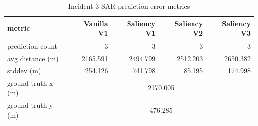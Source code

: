\begin{table}[ht]
\centering
\caption{Incident 3 SAR prediction error metrics}
\label{tab:sar-incident-3}
\begin{tabular}{lrrrr}
\hline
metric & Vanilla V1 & Saliency V1 & Saliency V2 & Saliency V3 \\
\hline
prediction count & 3 & 3 & 3 & 3 \\
avg distance (m) & 2165.591 & 2494.799 & 2512.203 & 2650.382 \\
stddev (m) & 254.126 & 741.798 & 85.195 & 174.998 \\
ground truth x (m) & \multicolumn{4}{c}{2170.005} \\
ground truth y (m) & \multicolumn{4}{c}{476.285} \\
\hline
\end{tabular}
\end{table}
